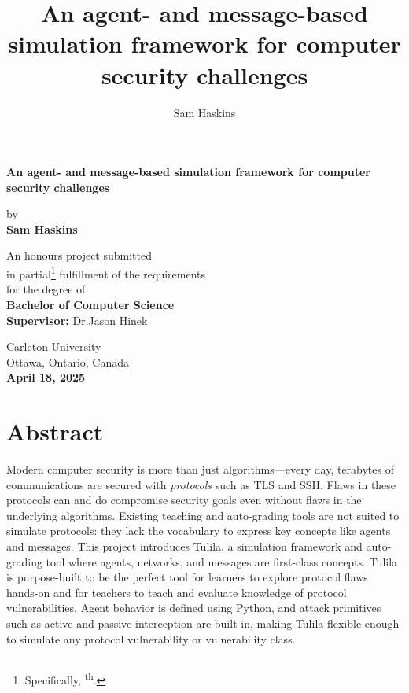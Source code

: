 \documentclass[12pt]{article}
\author{Sam Haskins}
\title{An agent- and message-based simulation framework for computer security challenges}
\begin{document}
\thispagestyle{empty}
\begin{center}
    \vspace*{0.9in}
    
    {\Large \textbf{An agent- and message-based simulation framework for computer security challenges} \par}
    \vspace{1in}
    
    {\large
    by \\
    \vspace{0.5in}
    \textbf{Sam Haskins} \par
    \vspace{0.9in}
    
    {
    An honours project submitted \\
    in partial\footnote{Specifically, {\normalsize {}}\textsuperscript{th}.} fulfillment of the requirements \\
    for the degree of \\
    \textbf{Bachelor of Computer Science} \\
    }
    \vspace{0.4in}
    \textbf{Supervisor:} Dr.\@ Jason Hinek \par
    \vspace{0.6in}
    
    {
    Carleton University \\
    Ottawa, Ontario, Canada\vspace{1.7mm} \\
    \textbf{April 18, 2025}
    }
    \par
    \vfill
    }
\end{center}

\section*{Abstract}

Modern computer security is more than just algorithms---every day, terabytes of communications are secured with \textit{protocols} such as TLS and SSH. Flaws in these protocols can and do compromise security goals even without flaws in the underlying algorithms. Existing teaching and auto-grading tools are not suited to simulate protocols: they lack the vocabulary to express key concepts like agents and messages. This project introduces Tulila, a simulation framework and auto-grading tool where agents, networks, and messages are first-class concepts. Tulila is purpose-built to be the perfect tool for learners to explore protocol flaws hands-on and for teachers to teach and evaluate knowledge of protocol vulnerabilities. Agent behavior is defined using Python, and attack primitives such as active and passive interception are built-in, making Tulila flexible enough to simulate any protocol vulnerability or vulnerability class.
\end{document}
